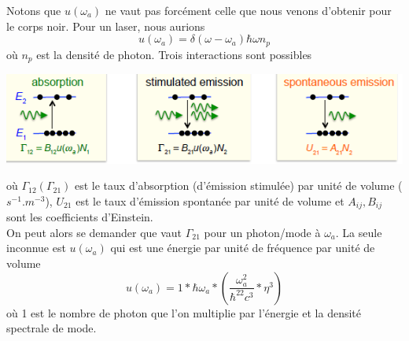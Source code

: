 	Notons que $u(\omega_a)$ ne vaut pas forcément celle que nous venons d'obtenir pour le corps
	noir. Pour un laser, nous aurions
	\begin{equation}
	u(\omega_a) = \delta(\omega-\omega_a)\hbar\omega n_p
	\end{equation}
	où $n_p$ est la densité de photon. 	Trois interactions sont possibles 
	\begin{center}
	\includegraphics[scale=0.85]{ch2/image11.png}
	\end{center}
	où $\Gamma_{12} (\Gamma_{21})$ est le taux d'absorption (d'émission stimulée) par unité de 
	volume ($s^{-1}.m^{-3}$), $U_{21}$ est le taux d'émission spontanée par unité de volume et 
	$A_{ij},B_{ij}$ sont les coefficients d'Einstein.\\
	
	On peut alors se demander que vaut $\Gamma_{21}$ pour un photon/mode à $\omega_a$. La seule
	inconnue est $u(\omega_a)$ qui est une énergie par unité de fréquence par unité de volume
	\begin{equation}
	u(\omega_a) = 1*\hbar\omega_a*\left(\dfrac{\omega_a^2}{\hbar^22c^3}*\eta^3\right)
	\end{equation}
	où 1 est le nombre de photon que l'on multiplie par l'énergie et la densité spectrale de mode.\\
	
